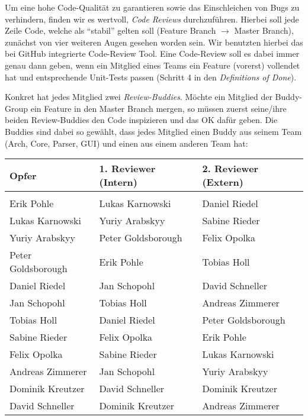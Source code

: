 Um eine hohe Code-Qualität zu garantieren sowie das Einschleichen von Bugs zu
verhindern, finden wir es wertvoll, \emph{Code Reviews} durchzuführen. Hierbei
soll jede Zeile Code, welche als ``stabil'' gelten soll (Feature Branch
$\rightarrow$ Master Branch), zunächst von vier weiteren Augen gesehen worden
sein. Wir benutzten hierbei das bei GitHub integrierte Code-Review Tool. Eine
Code-Review soll es dabei immer genau dann geben, wenn ein Mitglied eines Teams
ein Feature (vorerst) vollendet hat und entsprechende Unit-Tests passen (Schritt
4 in den \emph{Definitions of Done}).

Konkret hat jedes Mitglied zwei \emph{Review-Buddies}. Möchte ein Mitglied der
Buddy-Group ein Feature in den Master Branch mergen, so müssen zuerst seine/ihre
beiden Review-Buddies den Code inspizieren und das OK dafür geben. Die Buddies
sind dabei so gewählt, dass jedes Mitglied einen Buddy aus seinem Team (Arch,
Core, Parser, GUI) und einen aus einem anderen Team hat:

\begin{table}[h!]
  \centering
  \begin{tabular}{lll}
    \textbf{Opfer} & \textbf{1. Reviewer (Intern)} & \textbf{2. Reviewer (Extern)} \\
    \toprule \\
    Erik Pohle & Lukas Karnowski & Daniel Riedel \\
    Lukas Karnowski & Yuriy Arabskyy &  Sabine Rieder \\
    Yuriy Arabskyy & Peter Goldsborough & Felix Opolka \\
    Peter Goldsborough & Erik Pohle & Tobias Holl \\

    Daniel Riedel & Jan Schopohl & David Schneller \\
    Jan Schopohl & Tobias Holl & Andreas Zimmerer \\
    Tobias Holl & Daniel Riedel & Peter Goldsborough \\

    Sabine Rieder & Felix Opolka & Erik Pohle \\
    Felix Opolka & Sabine Rieder & Lukas Karnowski \\
    Andreas Zimmerer & Jan Schopohl & Yuriy Arabskyy \\

    Dominik Kreutzer & David Schneller & Dominik Kreutzer \\
    David Schneller & Dominik Kreutzer &  Andreas Zimmerer \\
    \bottomrule
  \end{tabular}
\end{table}

